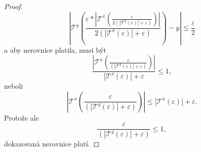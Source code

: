 \begin{theorem}
\begin{proof}
\begin{equation}
\left|\mathcal{T}^y\left(\frac{\varepsilon *\left|\mathcal{T}^x\left(\frac{\varepsilon}{2(|\mathcal{T}^y(\varepsilon)|+\varepsilon)}\right)\right|}{2(|\mathcal{T}^x(\varepsilon)|+\varepsilon)}\right)-y\right|\leq\frac{\varepsilon}{2}
\end{equation}
a aby nerovnice platila, musí být
\begin{equation}
\frac{\left|\mathcal{T}^x\left(\frac{\varepsilon}{(|\mathcal{T}^y(\varepsilon)|+\varepsilon)}\right)\right|}{|\mathcal{T}^x(\varepsilon)|+\varepsilon}\leq 1,
\end{equation}
neboli
\begin{equation}
\left|\mathcal{T}^x\left(\frac{\varepsilon}{(|\mathcal{T}^y(\varepsilon)|+\varepsilon)}\right)\right|\leq |\mathcal{T}^x(\varepsilon)|+\varepsilon.
\end{equation}
Protože ale
\begin{equation}
\frac{\varepsilon}{(|\mathcal{T}^y(\varepsilon)|+\varepsilon)} \leq 1,
\end{equation}
dokazovaná nerovnice platí.


\end{proof}
\end{theorem}
